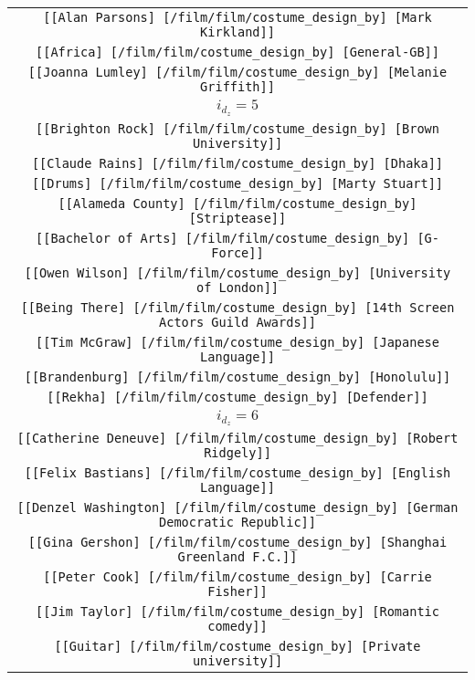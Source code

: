 \begin{longtable}{|c|}
    \texttt{[[Alan Parsons] [/film/film/costume\_design\_by] [Mark Kirkland]]}\\
    \texttt{[[Africa] [/film/film/costume\_design\_by] [General-GB]]}\\
    \texttt{[[Joanna Lumley] [/film/film/costume\_design\_by] [Melanie Griffith]]}\\ \hline
    \rowcolor[HTML]{EFEFEF} 
    \textsc{$i_{d_z}=5$}\\ \hline
    \texttt{[[Brighton Rock] [/film/film/costume\_design\_by] [Brown University]]}\\
    \texttt{[[Claude Rains] [/film/film/costume\_design\_by] [Dhaka]]}\\
    \texttt{[[Drums] [/film/film/costume\_design\_by] [Marty Stuart]]}\\
    \texttt{[[Alameda County] [/film/film/costume\_design\_by] [Striptease]]}\\
    \texttt{[[Bachelor of Arts] [/film/film/costume\_design\_by] [G-Force]]}\\
    \texttt{[[Owen Wilson] [/film/film/costume\_design\_by] [University of London]]}\\
    \texttt{[[Being There] [/film/film/costume\_design\_by] [14th Screen Actors Guild Awards]]}\\
    \texttt{[[Tim McGraw] [/film/film/costume\_design\_by] [Japanese Language]]}\\
    \texttt{[[Brandenburg] [/film/film/costume\_design\_by] [Honolulu]]}\\
    \texttt{[[Rekha] [/film/film/costume\_design\_by] [Defender]]}\\ \hline
    \rowcolor[HTML]{EFEFEF} 
    \textsc{$i_{d_z}=6$}\\ \hline
    \texttt{[[Catherine Deneuve] [/film/film/costume\_design\_by] [Robert Ridgely]]}\\
    \texttt{[[Felix Bastians] [/film/film/costume\_design\_by] [English Language]]}\\
    \texttt{[[Denzel Washington] [/film/film/costume\_design\_by] [German Democratic Republic]]}\\
    \texttt{[[Gina Gershon] [/film/film/costume\_design\_by] [Shanghai Greenland F.C.]]}\\
    \texttt{[[Peter Cook] [/film/film/costume\_design\_by] [Carrie Fisher]]}\\
    \texttt{[[Jim Taylor] [/film/film/costume\_design\_by] [Romantic comedy]]}\\
    \texttt{[[Guitar] [/film/film/costume\_design\_by] [Private university]]}\\

\end{longtable}
